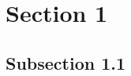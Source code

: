 \section{Section 1}
\label{sec:introduction}
\subsection{Subsection 1.1}











\FloatBarrier %



